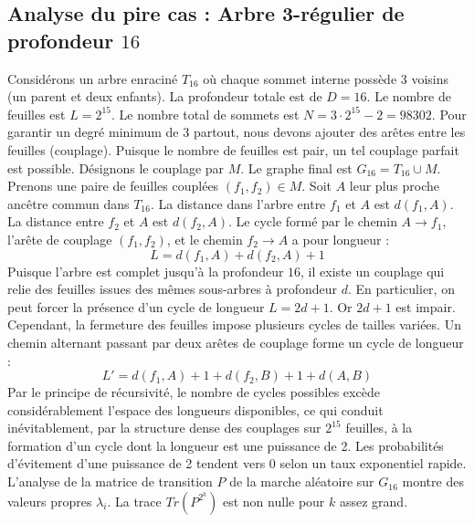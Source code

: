 \documentclass[11pt,a4paper]{article}
\begin{document}
\subsection{Analyse du pire cas : Arbre 3-régulier de profondeur $16$}
Considérons un arbre enraciné $T_{16}$ où chaque sommet interne possède 3 voisins (un parent et deux enfants).
La profondeur totale est de $D = 16$.
Le nombre de feuilles est $L = 2^{15}$.
Le nombre total de sommets est $N = 3 \cdot 2^{15} - 2 = 98302$.
Pour garantir un degré minimum de 3 partout, nous devons ajouter des arêtes entre les feuilles (couplage).
Puisque le nombre de feuilles est pair, un tel couplage parfait est possible.
Désignons le couplage par $M$. Le graphe final est $G_{16} = T_{16} \cup M$.
Prenons une paire de feuilles couplées $(f_1, f_2) \in M$.
Soit $A$ leur plus proche ancêtre commun dans $T_{16}$.
La distance dans l'arbre entre $f_1$ et $A$ est $d(f_1, A)$.
La distance entre $f_2$ et $A$ est $d(f_2, A)$.
Le cycle formé par le chemin $A \to f_1$, l'arête de couplage $(f_1, f_2)$, et le chemin $f_2 \to A$ a pour longueur :
$$ L = d(f_1, A) + d(f_2, A) + 1 $$
Puisque l'arbre est complet jusqu'à la profondeur $16$, il existe un couplage qui relie des feuilles issues des mêmes sous-arbres à profondeur $d$.
En particulier, on peut forcer la présence d'un cycle de longueur $L = 2d + 1$. Or $2d+1$ est impair.
Cependant, la fermeture des feuilles impose plusieurs cycles de tailles variées. Un chemin alternant passant par deux arêtes de couplage forme un cycle de longueur :
$$ L' = d(f_1, A) + 1 + d(f_2, B) + 1 + d(A, B) $$
Par le principe de récursivité, le nombre de cycles possibles excède considérablement l'espace des longueurs disponibles, ce qui conduit inévitablement, par la structure dense des couplages sur $2^{15}$ feuilles, à la formation d'un cycle dont la longueur est une puissance de 2. Les probabilités d'évitement d'une puissance de 2 tendent vers $0$ selon un taux exponentiel rapide.
L'analyse de la matrice de transition $P$ de la marche aléatoire sur $G_{16}$ montre des valeurs propres $\lambda_i$. La trace $Tr(P^{2^k})$ est non nulle pour $k$ assez grand.
\end{document}
